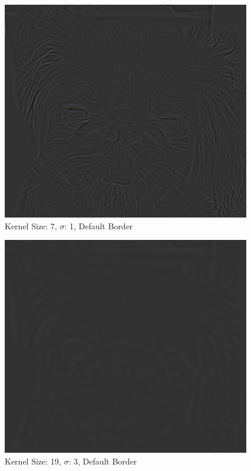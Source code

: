\documentclass{article}
\begin{document}
\begin{minipage}{\linewidth}
    \centering
    \begin{minipage}{0.45\linewidth}
        \begin{figure}[H]
			\includegraphics[width=\linewidth]{Ejercicio1c/dog(7,7)1_DEFAULT.png}             			
			\caption{Kernel Size: 7, $\sigma$: 1, Default Border}
        \end{figure}
    \end{minipage}
    \hspace{0.05\linewidth}
    \begin{minipage}{0.45\linewidth}
        \begin{figure}[H]
            \includegraphics[width=\linewidth]{Ejercicio1c/dog(19,19)3_DEFAULT.png}            
            \caption{Kernel Size: 19, $\sigma$: 3, Default Border}
        \end{figure}
    \end{minipage}
    

\end{minipage}
\end{document}
